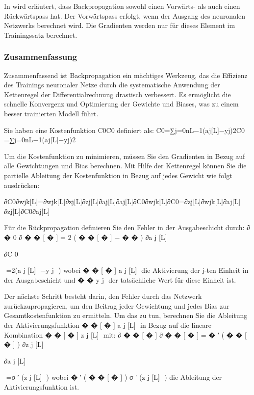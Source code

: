 In \cite[p.~43]{heaton_2012} wird erläutert, dass Backpropagation sowohl einen Vorwärts- als auch einen Rückwärtspass hat. Der Vorwärtspass erfolgt, wenn der Ausgang des neuronalen Netzwerks berechnet wird. Die Gradienten werden nur für dieses Element im Trainingssatz berechnet.

\subsubsection{Zusammenfassung}

Zusammenfassend ist Backpropagation ein mächtiges Werkzeug, das die Effizienz des Trainings neuronaler Netze durch die systematische Anwendung der Kettenregel der Differentialrechnung drastisch verbessert. Es ermöglicht die schnelle Konvergenz und Optimierung der Gewichte und Biases, was zu einem besser trainierten Modell führt.




Sie haben eine Kostenfunktion C0C0​ definiert als:
C0=∑j=0nL−1(aj[L]−yj)2C0​=∑j=0nL−1​​(aj[L]​−yj​)2

Um die Kostenfunktion zu minimieren, müssen Sie den Gradienten in Bezug auf alle Gewichtungen und Bias berechnen. Mit Hilfe der Kettenregel können Sie die partielle Ableitung der Kostenfunktion in Bezug auf jedes Gewicht wie folgt ausdrücken:

∂C0∂wjk[L]=∂wjk[L]∂zj[L]∂zj[L]∂aj[L]∂aj[L]∂C0∂wjk[L]​∂C0​​=∂zj[L]​∂wjk[L]​​∂aj[L]​∂zj[L]​​∂C0​∂aj[L]​​



Für die Rückpropagation definieren Sie den Fehler in der Ausgabeschicht durch:
∂
�
0
∂
�
�
[
�
]
=
2
(
�
�
[
�
]
−
�
�
)
∂a 
j
[L]
​
 
∂C 
0
​
 
​
 =2(a 
j
[L]
​
 −y 
j
​
 )
wobei 
�
�
[
�
]
a 
j
[L]
​
  die Aktivierung der j-ten Einheit in der Ausgabeschicht und 
�
�
y 
j
​
  der tatsächliche Wert für diese Einheit ist.

Der nächste Schritt besteht darin, den Fehler durch das Netzwerk zurückzupropagieren, um den Beitrag jeder Gewichtung und jedes Bias zur Gesamtkostenfunktion zu ermitteln. Um das zu tun, berechnen Sie die Ableitung der Aktivierungsfunktion 
�
�
[
�
]
a 
j
[L]
​
  in Bezug auf die lineare Kombination 
�
�
[
�
]
z 
j
[L]
​
  mit:
∂
�
�
[
�
]
∂
�
�
[
�
]
=
�
′
(
�
�
[
�
]
)
∂z 
j
[L]
​
 
∂a 
j
[L]
​
 
​
 =σ 
′
 (z 
j
[L]
​
 )
wobei 
�
′
(
�
�
[
�
]
)
σ 
′
 (z 
j
[L]
​
 ) die Ableitung der Aktivierungsfunktion ist.

